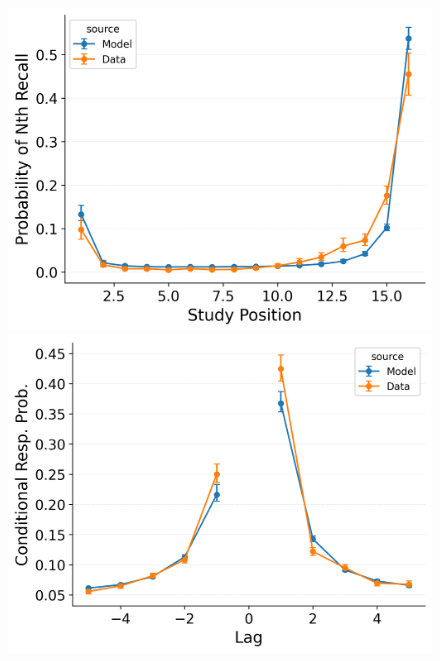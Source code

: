 \documentclass[
  man,
  floatsintext,
  longtable,
  nolmodern,
  notxfonts,
  notimes,
  draftfirst,
  colorlinks=true,linkcolor=blue,citecolor=blue,urlcolor=blue]{apa7}
\begin{document}
\begin{figure}
\begin{minipage}{0.33\linewidth}
\includegraphics{figures/HealeyKahana2014_CRU_with_Feature-to-Context__Pre-Expt__Primacy__and_StartDrift_Fitting_pnr.png}\end{minipage}%
%
\begin{minipage}{0.33\linewidth}
\includegraphics{figures/HealeyKahana2014_CRU_with_Feature-to-Context__Pre-Expt__Primacy__and_StartDrift_Fitting_crp.png}\end{minipage}%
%
\begin{minipage}{0.33\linewidth}

\end{minipage}
\end{figure}
\end{document}
